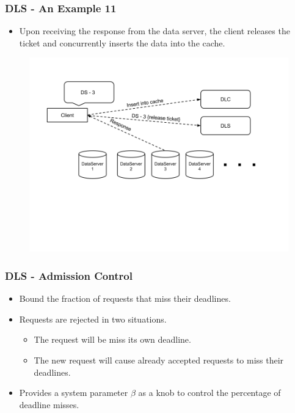 \documentclass{beamer}
\begin{document}
\begin{frame}
  \frametitle{DLS - An Example 11}
  \begin{itemize}
  \item Upon receiving the response from the data server, the client releases
    the ticket and concurrently inserts the data into the cache.
  \end{itemize}
  \begin{figure}
    \begin{center}
      \centerline{\includegraphics[scale=0.35]{img/DLS_Example12.png}}
    \end{center}
  \end{figure}
\end{frame}


\begin{frame}
  \frametitle{DLS - Admission Control}
  \begin{itemize}
  \item Bound the fraction of requests that miss their deadlines.
  \item Requests are rejected in two situations.
    \begin{itemize}
      \item The request will be miss its own deadline.
      \item The new request will cause already accepted requests to miss their deadlines.
    \end{itemize}
  \item Provides a system parameter $\beta$ as a knob to control the percentage
    of deadline misses.
  \end{itemize}
\end{frame}
\end{document}
